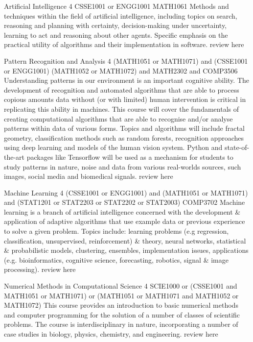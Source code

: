 	{Artificial Intelligence}
	{4}
	{CSSE1001 or ENGG1001}
	{MATH1061}
	{}
	{Methods and techniques within the field of artificial intelligence, including topics on search, reasoning and planning with certainty, decision-making under uncertainty, learning to act and reasoning about other agents. Specific emphasis on the practical utility of algorithms and their implementation in software.}
	{review here}

	{Pattern Recognition and Analysis}
	{4}
	{(MATH1051 or MATH1071) and (CSSE1001 or ENGG1001)}
	{(MATH1052 or MATH1072) and MATH2302 and COMP3506}
	{}
	{Understanding patterns in our environment is an important cognitive ability. The development of recognition and automated algorithms that are able to process copious amounts data without (or with limited) human intervention is critical in replicating this ability in machines. This course will cover the fundamentals of creating computational algorithms that are able to recognise and/or analyse patterns within data of various forms. Topics and algorithms will include fractal geometry, classification methods such as random forests, recognition approaches using deep learning and models of the human vision system. Python and state-of-the-art packages like Tensorflow will be used as a mechanism for students to study patterns in nature, noise and data from various real-worlds sources, such images, social media and biomedical signals.}
	{review here}

	{Machine Learning}
	{4}
	{(CSSE1001 or ENGG1001) and (MATH1051 or MATH1071) and (STAT1201 or STAT2203 or STAT2202 or STAT2003)}
	{COMP3702}
	{}
	{Machine learning is a branch of artificial intelligence concerned with the development \& application of adaptive algorithms that use example data or previous experience to solve a given problem. Topics include: learning problems (e.g regression, classification, unsupervised, reinforcement) \& theory, neural networks, statistical \& probabilistic models, clustering, ensembles, implementation issues, applications (e.g. bioinformatics, cognitive science, forecasting, robotics, signal \& image processing).}
	{review here}

	{Numerical Methods in Computational Science}
	{4}
	{SCIE1000 or (CSSE1001 and MATH1051 or MATH1071) or (MATH1051 or MATH1071 and MATH1052 or MATH1072)}
	{}
	{}
	{This course provides an introduction to basic numerical methods and computer programming for the solution of a number of classes of scientific problems. The course is interdisciplinary in nature, incorporating a number of case studies in biology, physics, chemistry, and engineering.}
	{review here}

